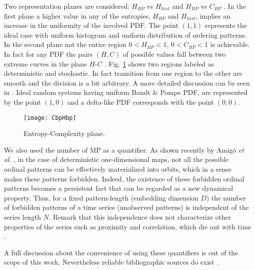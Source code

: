 Two representation planes are considered: $H_{BP}$ vs $H_{hist}$ \cite{DeMicco2008} and $H_{BP}$ vs $C_{BP}$ \cite{Rosso2007}.
In the first plane a higher value in any of the entropies, $H_{BP}$ and $H_{hist}$, implies an increase in the uniformity of the involved PDF.
The point $(1,1)$ represents the ideal case with uniform histogram and uniform distribution of ordering patterns.
In the second plane not the entire region $0<H_{BP}<1$, $0<C_{BP}<1$ is achievable.
In fact for any PDF the pairs $(H,C)$ of possible values fall between two extreme curves in the plane $H$-$C$ \cite{Anteneodo1996}.
Fig. \ref{fig:CbpHbp} shows two regions labeled as deterministic and stochastic. In fact transition from one region to the other are smooth and the division is a bit arbitrary. 
A more detailed discussion can be seen in \cite{Rosso2007}. 
Ideal random systems having uniform Bandt \& Pompe PDF, are represented by the point $(1,0)$ \cite{Gonzalez2005} and a delta-like PDF corresponds with the point $(0,0)$.

\begin{figure}
	\centering	
	\texttt{[image: CbpHbp]}
	\caption{Entropy-Complexity plane.}
	\label{fig:CbpHbp}
\end{figure}

We also used the number of MP as a quantifier\cite{Rosso2012}.
As shown recently by Amig\'o {\it et al.} \cite{Amigo2006,Amigo2007,Amigo2008,Amigo2010}, in the case of deterministic one-dimensional maps, not all the possible ordinal patterns can be effectively materialized into orbits, which in a sense makes these patterns forbidden.
Indeed, the existence of these forbidden ordinal patterns becomes a persistent fact that can be regarded as a new dynamical property.
Thus, for a fixed pattern-length (embedding dimension $D$) the number of forbidden patterns of a time series (unobserved patterns) is independent of the series length $N$.
Remark that this independence does not characterize other properties of the series such as proximity and correlation, which die out with time \cite{Amigo2007,Amigo2010}.

A full discussion about the convenience of using these quantifiers is out of the scope of this work.
Nevertheless reliable bibliographic sources do exist \cite{Wackerbauer1994,Lopez-Ruiz1995,Rosso2007A,DeMicco2008,Rosso2010,Martin2006,Rosso2012}.



